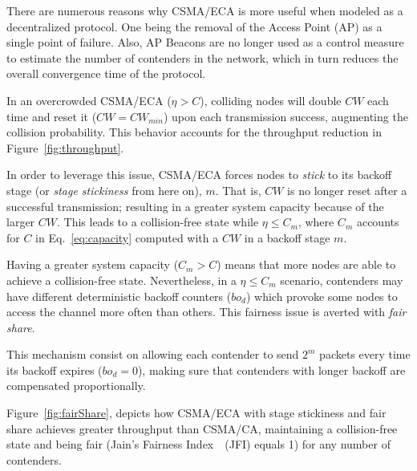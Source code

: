 There are numerous reasons why CSMA/ECA is more useful when modeled as a decentralized protocol. One being the removal of the Access Point (AP) as a single point of failure. Also, AP Beacons are no longer used as a control measure to estimate the number of contenders in the network, which in turn reduces the overall convergence time of the protocol.


In an overcrowded CSMA/ECA ($\eta>C$), colliding nodes will double $CW$ each time and reset it ($CW=CW_{min}$) upon each transmission success, augmenting the collision probability. This behavior accounts for the throughput reduction in Figure~\ref{fig:throughput}.

In order to leverage this issue, CSMA/ECA forces nodes to \emph{stick} to its backoff stage (or \emph{stage stickiness} from here on), $m$. That is, $CW$ is no longer reset after a successful transmission; resulting in a greater system capacity because of the larger $CW$. This leads to a collision-free state while $\eta\leq C_{m}$, where $C_{m}$ accounts for $C$ in Eq.~\ref{eq:capacity} computed with a $CW$ in a backoff stage $m$.

Having a greater system capacity ($C_{m} > C$) means that more nodes are able to achieve a collision-free state. Nevertheless, in a $\eta\leq C_{m}$ scenario, contenders may have different deterministic backoff counters ($bo_{d}$) which provoke some nodes to access the channel more often than others. This fairness issue is averted with \emph{fair share}.

This mechanism consist on allowing each contender to send $2^{m}$ packets every time its backoff expires ($bo_{d}=0$), making sure that contenders with longer backoff are compensated proportionally.

Figure~\ref{fig:fairShare}, depicts how CSMA/ECA with stage stickiness and fair share achieves greater throughput than CSMA/CA, maintaining a collision-free state and being fair (Jain's Fairness Index~\cite{JFI}~(JFI) equals 1) for any number of contenders.


